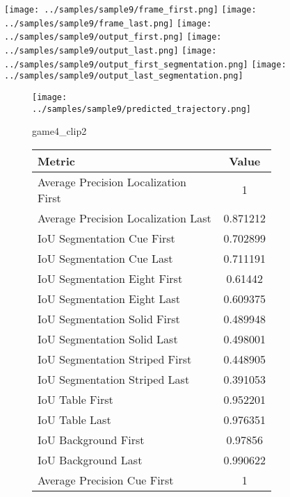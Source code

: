 \begin{figure}
    \texttt{[image: ../samples/sample9/frame\_first.png]}
    \texttt{[image: ../samples/sample9/frame\_last.png]}
    \newline
    \texttt{[image: ../samples/sample9/output\_first.png]}
    \texttt{[image: ../samples/sample9/output\_last.png]}
    \newline
    \texttt{[image: ../samples/sample9/output\_first\_segmentation.png]}
    \texttt{[image: ../samples/sample9/output\_last\_segmentation.png]}
    \newline
    \begin{subfigure}[b]{0.49\textwidth}
        \vspace{20pt}
        \texttt{[image: ../samples/sample9/predicted\_trajectory.png]}
        \caption*{game4\_clip2}
    \end{subfigure}
\begin{subfigure}[b]{0.49\textwidth}
    \begin{tabular}{|l|c|}
        \hline
        \textbf{Metric} & \textbf{Value} \\
        \hline
        Average Precision Localization First & 1 \\
        Average Precision Localization Last & 0.871212 \\
        \hline
        IoU Segmentation Cue First & 0.702899 \\
        IoU Segmentation Cue Last & 0.711191 \\
        IoU Segmentation Eight First & 0.61442 \\
        IoU Segmentation Eight Last & 0.609375 \\
        IoU Segmentation Solid First & 0.489948 \\
        IoU Segmentation Solid Last & 0.498001 \\
        IoU Segmentation Striped First & 0.448905 \\
        IoU Segmentation Striped Last & 0.391053 \\
        \hline
        IoU Table First & 0.952201 \\
        IoU Table Last & 0.976351 \\
        IoU Background First & 0.97856 \\
        IoU Background Last & 0.990622 \\
        \hline
        Average Precision Cue First & 1 \\

\end{tabular}
\end{subfigure}
\end{figure}
